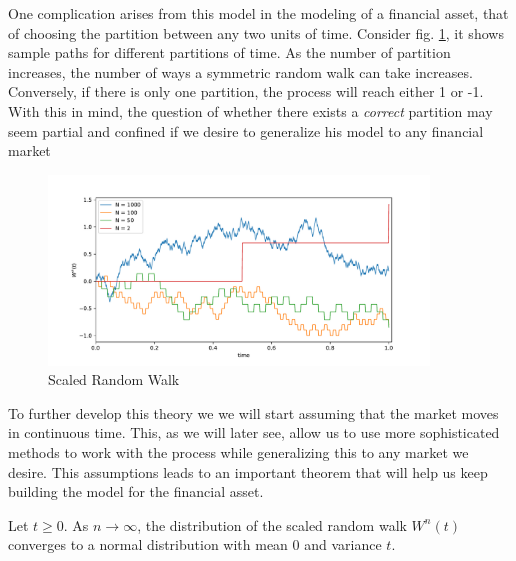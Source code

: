 \documentclass[../TGMAFFIRO]{subfiles}
\begin{document}
One complication arises from this model in the modeling of a financial asset, that of choosing the partition between any two units of time. Consider fig. \ref{fig:scaled_random_walk}, it shows sample paths for different partitions of time. As the number of partition increases, the number of ways a symmetric random walk can take increases. Conversely, if there is only one partition, the process will reach either 1 or -1. With this in mind, the question of whether there exists a \textit{correct} partition may seem partial and confined if we desire to generalize his model to any financial market\\

\begin{figure}[h]
	\label{fig:scaled_random_walk}
	\centering
	\includegraphics[width=0.9\textwidth]{images/scaled_random_walk}
	\caption{Scaled Random Walk}
\end{figure}



To further develop this theory we we will start assuming that the market moves in continuous time. This, as we will later see, allow us to use more sophisticated methods to work with the process while generalizing this to any market we desire. This assumptions leads to an important theorem that will help us keep building the model for the financial asset.

\begin{theorem}\label{th:convergence_rw}
	Let $t \geq 0$. As $n \to \infty$, the distribution of the scaled random walk $W^n(t)$ converges to a normal distribution with mean $0$ and variance $t$.
\end{theorem}
\end{document}
